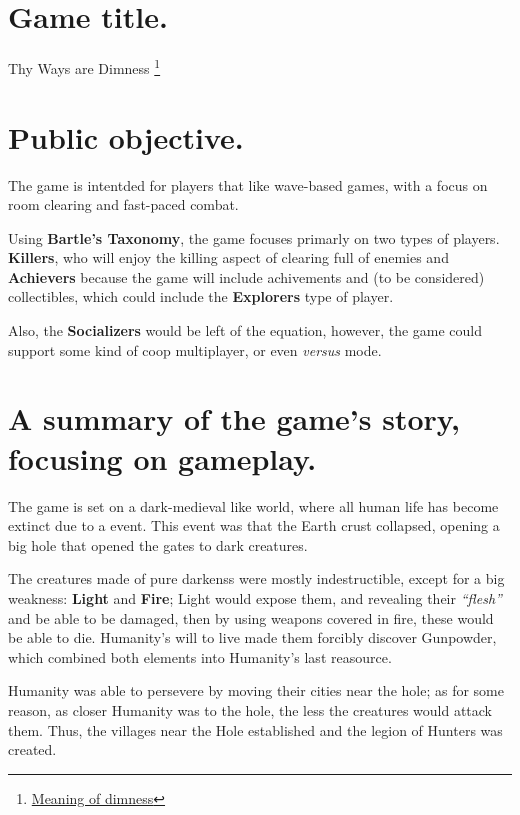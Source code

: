 \documentclass[12pt]{article}
\begin{document}

\section{Game title.}
Thy Ways are Dimness \footnote{\href{https://dictionary.cambridge.org/es/diccionario/ingles/dimness}{Meaning of dimness}}


\section{Public objective.}
The game is intentded for players that like wave-based games, with a focus on room clearing and fast-paced combat.

Using \textbf{Bartle's Taxonomy}, the game focuses primarly on two types of players. \textbf{Killers}, who will enjoy the killing aspect of clearing full of enemies and \textbf{Achievers} because the game will include achivements and (to be considered) collectibles, which could include the \textbf{Explorers} type of player.

Also, the \textbf{Socializers} would be left of the equation, however, the game could support some kind of coop multiplayer, or even \textit{versus} mode.


\section{A summary of the game's story, focusing on gameplay.}
The game is set on a dark-medieval like world, where all human life has become extinct due to a event. This event was that the Earth crust collapsed, opening a big hole that opened the gates to dark creatures.

The creatures made of pure darkenss were mostly indestructible, except for a big weakness: \textbf{Light} and \textbf{Fire}; Light would expose them, and revealing their \textit{“flesh”} and be able to be damaged, then by using weapons covered in fire, these would be able to die. Humanity's will to live made them forcibly discover Gunpowder, which combined both elements into Humanity's last reasource.

Humanity was able to persevere by moving their cities near the hole; as for some reason, as closer Humanity was to the hole, the less the creatures would attack them. Thus, the villages near the Hole established and the legion of Hunters was created.
\end{document}
